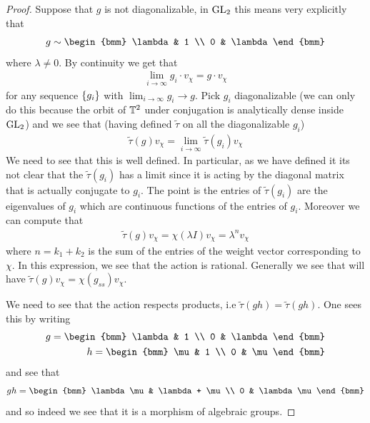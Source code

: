 \documentclass[12pt]{article}
\begin{document}
\begin{proof}
Suppose that $g$ is not diagonalizable, in $\operatorname{GL}_2$ this means very explicitly that \begin{align*}
    g\sim \begin{bmm}
        \lambda & 1 \\
        0 & \lambda
    \end{bmm}
\end{align*} where $\lambda \neq 0$.
By continuity we get that \begin{align*}
    \lim_{i\to\infty} g_i \cdot v_\chi = g\cdot v_\chi
\end{align*} for any sequence $\{g_i\}$ with $\lim_{i\to\infty}g_i\to g$.
Pick $g_i$ diagonalizable (we can only do this because the orbit of $\mathbb{T}^2$ under conjugation is analytically dense inside $\operatorname{GL}_2$) and we see that (having defined $\tilde\tau$ on all the diagonalizable $g_i$) \begin{align*}
    \tilde\tau(g)v_\chi = \lim_{i\to\infty}\tilde\tau(g_i) v_\chi
\end{align*} We need to see that this is well defined. In particular, as we have defined it its not clear that the $\tilde\tau(g_i)$ has a limit since it is acting by the diagonal matrix that is actually conjugate to $g_i$. The point is the entries of $\tilde\tau(g_i)$ are the eigenvalues of $g_i$ which are continuous functions of the entries of $g_i$. Moreover we can compute that \begin{align*}
    \tilde\tau(g)v_\chi = \chi(\lambda I)v_\chi  = \lambda^nv_\chi
\end{align*} where $n = k_1 + k_2$ is the sum of the entries of the weight vector corresponding to $\chi$. In this expression, we see that the action is rational. Generally we see that will have $\tilde\tau(g)v_\chi = \chi(g_{ss})v_\chi$. 

\hfill 

We need to see that the action respects products, i.e $\tilde\tau(gh) = \tilde\tau(gh)$. One sees this by writing \begin{align*}
    g = \begin{bmm}
        \lambda & 1 \\
        0 & \lambda
    \end{bmm} \\
    h = \begin{bmm}
        \mu & 1 \\
        0 & \mu
    \end{bmm}
\end{align*} and see that \begin{align*}
    gh = \begin{bmm}
        \lambda\mu & \lambda + \mu \\
        0 & \lambda\mu
    \end{bmm}
\end{align*} and so indeed we see that it is a morphism of algebraic groups.
\end{proof}
\end{document}
